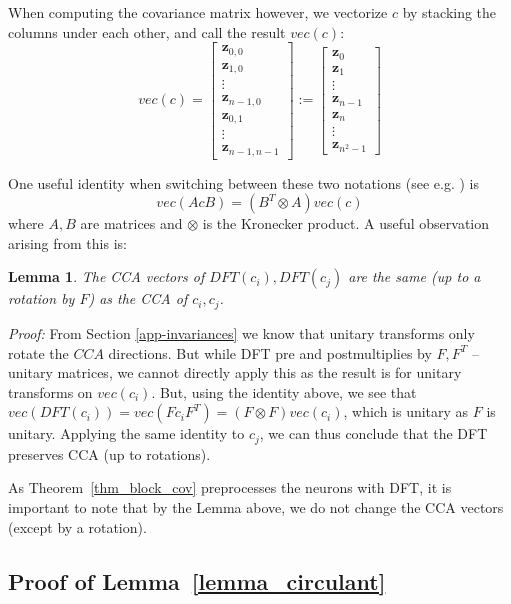 \documentclass{article} %
\newtheorem{lemma}{Lemma}
\begin{document}
When computing the covariance matrix however, we vectorize $c$ by stacking the columns under each other, and call the result $vec(c)$:
\[
vec(c) =
\begin{bmatrix}
    \pmb{z}_{0,0} \\
    \pmb{z}_{1,0} \\
    \vdots \\
    \pmb{z}_{n-1,0} \\
    \pmb{z}_{0,1} \\
    \vdots \\
    \pmb{z}_{n-1,n-1}
\end{bmatrix}
:=
\begin{bmatrix}
    \pmb{z}_{0} \\
    \pmb{z}_{1} \\
    \vdots \\
    \pmb{z}_{n-1} \\
    \pmb{z}_{n} \\
    \vdots \\
    \pmb{z}_{n^2 - 1}
\end{bmatrix}
\]

One useful identity when switching between these two notations (see e.g. \cite{matrixanalysis}) is
\[ vec(AcB) = (B^T \otimes A) vec(c) \]
where $A, B$ are matrices and $\otimes$ is the Kronecker product. A useful observation arising from this is:

\begin{lemma}
The CCA vectors of $DFT(c_i), DFT(c_j)$ are the same (up to a rotation by $F$) as the CCA of $c_i, c_j$.
\end{lemma}

\textit{Proof:} From Section \ref{app-invariances} we know that unitary transforms only rotate the $CCA$ directions. But while DFT pre and postmultiplies by $F, F^T$ -- unitary matrices, we cannot directly apply this as the result is for unitary transforms on $vec(c_i)$.  But, using the identity above, we see that $ vec(DFT(c_i)) = vec(F c_i F^T ) = (F \otimes F) vec(c_i)$, which is unitary as $F$ is unitary. Applying the same identity to $c_j$, we can thus conclude that the DFT preserves CCA (up to rotations).

As Theorem~\ref{thm_block_cov} preprocesses the neurons with DFT, it is important to note that by the Lemma above, we do not change the CCA vectors (except by a rotation).

\subsection{Proof of Lemma~\ref{lemma_circulant}}
\end{document}
